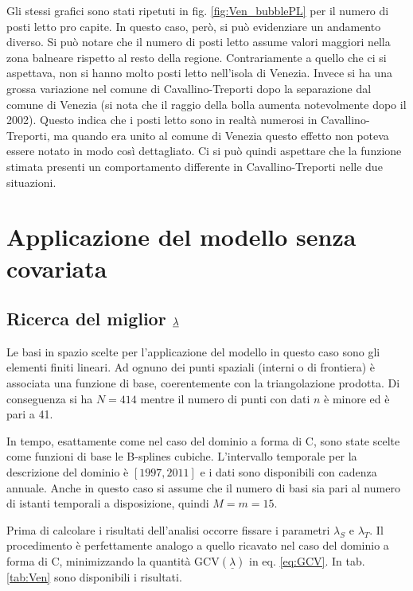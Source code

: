 \documentclass[a4paper,11pt,twoside,openright]{book}							%
\begin{document}
Gli stessi grafici sono stati ripetuti in fig. \ref{fig:Ven_bubblePL} per il numero di posti letto pro capite. In questo caso, però, si può evidenziare un andamento diverso. Si può notare che il numero di posti letto assume valori maggiori nella zona balneare rispetto al resto della regione. Contrariamente a quello che ci si aspettava, non si hanno molto posti letto nell'isola di Venezia. Invece si ha una grossa variazione nel comune di Cavallino-Treporti dopo la separazione dal comune di Venezia (si nota che il raggio della bolla aumenta notevolmente dopo il 2002). Questo indica che i posti letto sono in realtà numerosi in Cavallino-Treporti, ma quando era unito al comune di Venezia questo effetto non poteva essere notato in modo così dettagliato. Ci si può quindi aspettare che la funzione stimata presenti un comportamento differente in Cavallino-Treporti nelle due situazioni.


\section{Applicazione del modello senza covariata}

\subsection{Ricerca del miglior $\protect\underline{\lambda}$}
Le basi in spazio scelte per l'applicazione del modello in questo caso sono gli elementi finiti lineari. Ad ognuno dei punti spaziali (interni o di frontiera) è associata una funzione di base, coerentemente con la triangolazione prodotta. Di conseguenza si ha $N=414$ mentre il numero di punti con dati $n$ è minore ed è pari a 41.

In tempo, esattamente come nel caso del dominio a forma di C, sono state scelte come funzioni di base le B-splines cubiche. L'intervallo temporale per la descrizione del dominio è $[1997,2011]$ e i dati sono disponibili con cadenza annuale. Anche in questo caso si assume che il numero di basi sia pari al numero di istanti temporali a disposizione, quindi $M=m=15$.

Prima di calcolare i risultati dell'analisi occorre fissare i parametri $\lambda_S$ e $\lambda_T$. Il procedimento è perfettamente analogo a quello ricavato nel caso del dominio a forma di C, minimizzando la quantità $\mathrm{GCV}(\underline \lambda)$ in eq. \ref{eq:GCV}. In tab. \ref{tab:Ven} sono disponibili i risultati.
\end{document}
